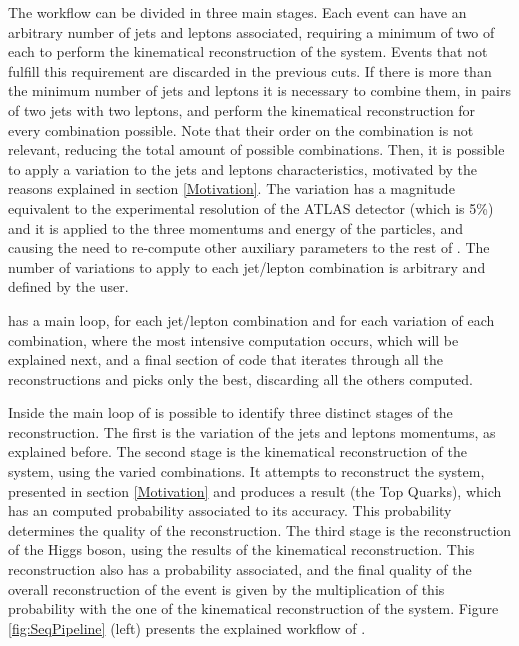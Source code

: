 The \ttDilepKinFit workflow can be divided in three main stages. Each event can have an arbitrary number of jets and leptons associated, requiring a minimum of two of each to perform the kinematical reconstruction of the \ttbar system. Events that not fulfill this requirement are discarded in the previous cuts. If there is more than the minimum number of jets and leptons it is necessary to combine them, in pairs of two jets with two leptons, and perform the kinematical reconstruction for every combination possible. Note that their order on the combination is not relevant, reducing the total amount of possible combinations. Then, it is possible to apply a variation to the jets and leptons characteristics, motivated by the reasons explained in section \ref{Motivation}. The variation has a magnitude equivalent to the experimental resolution of the ATLAS detector (which is 5\%) and it is applied to the three momentums and energy of the particles, and causing the need to re-compute other auxiliary parameters to the rest of \ttDilepKinFit. The number of variations to apply to each jet/lepton combination is arbitrary and defined by the user.

\ttDilepKinFit has a main loop, for each jet/lepton combination and for each variation of each combination, where the most intensive computation occurs, which will be explained next, and a final section of code that iterates through all the reconstructions and picks only the best, discarding all the others computed.

Inside the main loop of \ttDilepKinFit is possible to identify three distinct stages of the reconstruction. The first is the variation of the jets and leptons momentums, as explained before. The second stage is the kinematical reconstruction of the \ttbar system, using the varied combinations. It attempts to reconstruct the \ttbar system, presented in section \ref{Motivation} and produces a result (the Top Quarks), which has an computed probability associated to its accuracy. This probability determines the quality of the reconstruction. The third stage is the reconstruction of the Higgs boson, using the results of the kinematical reconstruction. This reconstruction also has a probability associated, and the final quality of the overall reconstruction of the event is given by the multiplication of this probability with the one of the kinematical reconstruction of the \ttbar system. Figure \ref{fig:SeqPipeline} (left) presents the explained workflow of \ttDilepKinFit.

